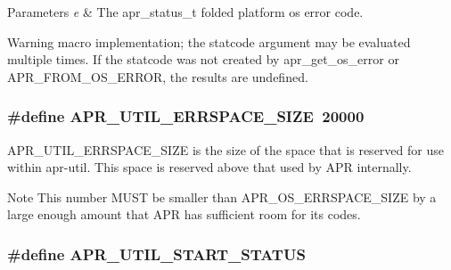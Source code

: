 \begin{DoxyParams}{Parameters}
{\em e} & The apr\-\_\-status\-\_\-t folded platform os error code. \\
\hline
\end{DoxyParams}
\begin{DoxyWarning}{Warning}
macro implementation; the statcode argument may be evaluated multiple times. If the statcode was not created by apr\-\_\-get\-\_\-os\-\_\-error or A\-P\-R\-\_\-\-F\-R\-O\-M\-\_\-\-O\-S\-\_\-\-E\-R\-R\-O\-R, the results are undefined. 
\end{DoxyWarning}
\hypertarget{group__apr__errno_gaef5e79630739f24d1512d0d044c2bae7}{
\subsubsection[{A\-P\-R\-\_\-\-U\-T\-I\-L\-\_\-\-E\-R\-R\-S\-P\-A\-C\-E\-\_\-\-S\-I\-Z\-E}]{\setlength{\rightskip}{0pt plus 5cm}\#define A\-P\-R\-\_\-\-U\-T\-I\-L\-\_\-\-E\-R\-R\-S\-P\-A\-C\-E\-\_\-\-S\-I\-Z\-E~20000}}\label{group__apr__errno_gaef5e79630739f24d1512d0d044c2bae7}
A\-P\-R\-\_\-\-U\-T\-I\-L\-\_\-\-E\-R\-R\-S\-P\-A\-C\-E\-\_\-\-S\-I\-Z\-E is the size of the space that is reserved for use within apr-\/util. This space is reserved above that used by A\-P\-R internally. \begin{DoxyNote}{Note}
This number M\-U\-S\-T be smaller than A\-P\-R\-\_\-\-O\-S\-\_\-\-E\-R\-R\-S\-P\-A\-C\-E\-\_\-\-S\-I\-Z\-E by a large enough amount that A\-P\-R has sufficient room for its codes. 
\end{DoxyNote}
\hypertarget{group__apr__errno_gadf26297a72afa0ea224e7097fe59a1cd}{
\subsubsection[{A\-P\-R\-\_\-\-U\-T\-I\-L\-\_\-\-S\-T\-A\-R\-T\-\_\-\-S\-T\-A\-T\-U\-S}]{\setlength{\rightskip}{0pt plus 5cm}\#define A\-P\-R\-\_\-\-U\-T\-I\-L\-\_\-\-S\-T\-A\-R\-T\-\_\-\-S\-T\-A\-T\-U\-S}}\label{group__apr__errno_gadf26297a72afa0ea224e7097fe59a1cd}

